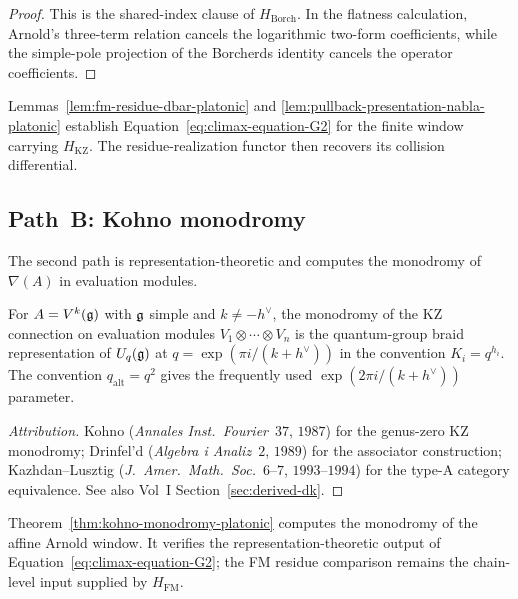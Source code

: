 \begin{proof}
This is the shared-index clause of $H_{\mathrm{Borch}}$.  In the
flatness calculation, Arnold's three-term relation cancels the
logarithmic two-form coefficients, while the simple-pole projection of
the Borcherds identity cancels the operator coefficients.
\end{proof}

\begin{remark}
\label{rem:path-A-closure-platonic}
Lemmas~\ref{lem:fm-residue-dbar-platonic} and
\ref{lem:pullback-presentation-nabla-platonic} establish
Equation~\eqref{eq:climax-equation-G2} for the finite window carrying
$H_{\mathrm{KZ}}$.  The residue-realization functor then recovers its
collision differential.
\end{remark}

\subsection{Path~B: Kohno monodromy}
\label{ssec:climax-platonic-path-B-kohno}

The second path is representation-theoretic and computes the
monodromy of $\nabla(A)$ in evaluation modules.

\begin{theorem}[Kohno 1987]
\label{thm:kohno-monodromy-platonic}
\ClaimStatusProvedElsewhere
For $A = V^{k}(\mathfrak{g})$ with $\mathfrak{g}$ simple and $k\neq-h^\vee$, the
monodromy of the KZ connection on evaluation modules
$V_1 \otimes \cdots \otimes V_n$ is the quantum-group braid
representation of $U_{q}(\mathfrak{g})$ at
$q=\exp(\pi i/(k+h^\vee))$ in the convention $K_i=q^{h_i}$.
The convention $q_{\mathrm{alt}}=q^2$ gives the frequently used
$\exp(2\pi i/(k+h^\vee))$ parameter.
\end{theorem}

\begin{proof}[Attribution]
Kohno (\textit{Annales Inst.\ Fourier}~$37$, $1987$) for the genus-zero
KZ monodromy; Drinfel'd (\textit{Algebra i Analiz}~$2$, $1989$) for
the associator construction; Kazhdan--Lusztig
(\textit{J.\ Amer.\ Math.\ Soc.}~$6$--$7$, $1993$--$1994$) for the
type-A category equivalence. See also Vol~I Section~\ref{sec:derived-dk}.
\end{proof}

\begin{remark}
\label{rem:path-B-closure-platonic}
Theorem~\ref{thm:kohno-monodromy-platonic} computes the monodromy of
the affine Arnold window.  It verifies the representation-theoretic
output of Equation~\eqref{eq:climax-equation-G2}; the FM residue
comparison remains the chain-level input supplied by
$H_{\mathrm{FM}}$.
\end{remark}

